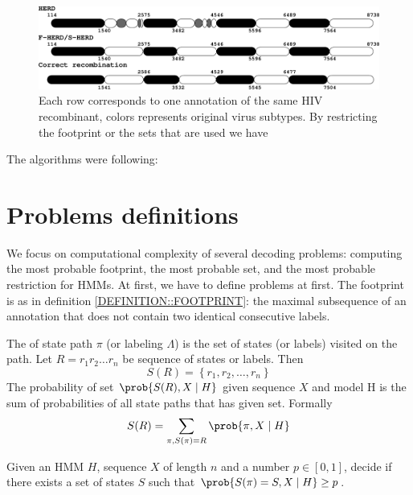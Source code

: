 \begin{figure}
\begin{center}
\includegraphics[width=14cm]{../figures/jcss/happyStory.pdf}
\end{center}
\caption[Example of annotation with systematic error.]{
Each row corresponds to one annotation of the same HIV recombinant, colors
represents original virus subtypes. By restricting the footprint or the sets
that are used we have 
}\label{FIGURE:HERD_BAD}
\end{figure}

The algorithms were following:


\section{Problems definitions}

We focus on computational complexity of several decoding problems: computing the
most probable footprint, the most probable set, and the most probable
restriction for HMMs. At first, we have to define problems at first. The
footprint is as in definition \ref{DEFINITION::FOOTPRINT}: the maximal
subsequence of an annotation that does not contain two identical consecutive
labels.

\begin{definition}
The  of state path $\pi$ (or labeling $\Lambda$) is the set of
states (or labels) visited on the path. Let $R=r_1r_2\dots r_n$ be sequence of
states or labels. Then 
\begin{equation*}
S(R) = \left\{r_1,r_2,\dots, r_n\right\}
\end{equation*}
The probability of set $\prob{S(R), X\mid H}$ given sequence $X$ and model H is the sum of
probabilities of all state paths that has given set. Formally
\begin{equation*}
S(R) = \sum_{\pi, S(\pi) = R}\prob{\pi, X\mid H}
\end{equation*}
\end{definition}

\begin{definition}
 Given an HMM $H$, sequence $X$ of
length $n$ and a number $p\in [0,1]$, decide if there exists a set of states $S$
such that $\prob{S(\pi) = S, X\mid H} \geq p$.
\end{definition}

